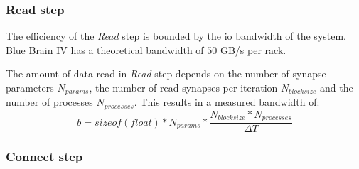 \subsubsection{Read step}
The efficiency of the \emph{Read} step is bounded by the io bandwidth of the system.
Blue Brain IV has a theoretical bandwidth of $50$ GB/s per rack.

The amount of data read in \emph{Read} step depends on the number of synapse parameters $N_{params}$,
the number of read synapses per iteration $N_{blocksize}$ and the number of processes $N_{processes}$.
This results in a measured bandwidth of:
\begin{equation}
b = sizeof(float) * N_{params} * \frac{N_{blocksize} * N_{processes}}{\Delta T}
\end{equation}
\subsubsection{Connect step}

